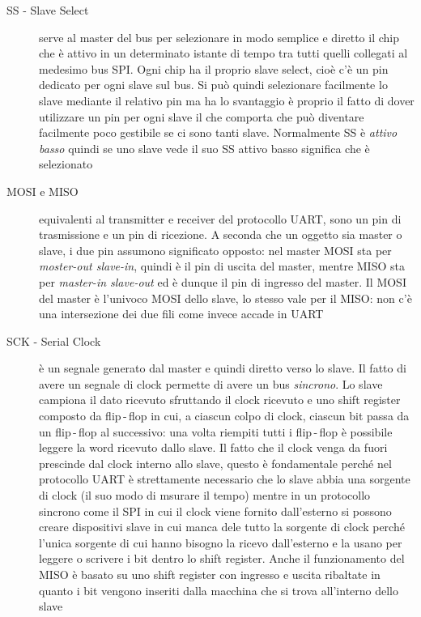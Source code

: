 \documentclass[12pt, a4paper]{report}
\begin{document}
\begin{description}
    \item[SS - Slave Select] serve al master del bus per selezionare in modo semplice e diretto il chip che è attivo in un determinato istante di tempo tra tutti quelli collegati al medesimo bus SPI. Ogni chip ha il proprio slave select, cioè c'è un pin dedicato per ogni slave sul bus. Si può quindi selezionare facilmente lo slave mediante il relativo pin ma ha lo svantaggio è proprio il fatto di dover utilizzare un pin per ogni slave il che comporta che può diventare facilmente poco gestibile se ci sono tanti slave. Normalmente SS è \textit{attivo basso} quindi se uno slave vede il suo SS attivo basso significa che è selezionato
    \item[MOSI e MISO] equivalenti al transmitter e receiver del protocollo UART, sono un pin di trasmissione e un pin di ricezione. A seconda che un oggetto sia master o slave, i due pin assumono significato opposto: nel master MOSI sta per \textit{moster-out slave-in}, quindi è il pin di uscita del master, mentre MISO sta per \textit{master-in slave-out} ed è dunque il pin di ingresso del master. Il MOSI del master è l'univoco MOSI dello slave, lo stesso vale per il MISO: non c'è una intersezione dei due fili come invece accade in UART
    \item[SCK - Serial Clock] è un segnale generato dal master e quindi diretto verso lo slave. Il fatto di avere un segnale di clock permette di avere un bus \textit{sincrono}. Lo slave campiona il dato ricevuto sfruttando il clock ricevuto e uno shift register composto da flip\,-\,flop in cui, a ciascun colpo di clock, ciascun bit passa da un flip\,-\,flop al successivo: una volta riempiti tutti i flip\,-\,flop è possibile leggere la word ricevuto dallo slave. Il fatto che il clock venga da fuori prescinde dal clock interno allo slave, questo è fondamentale perché nel protocollo UART è strettamente necessario che lo slave abbia una sorgente di clock (il suo modo di msurare il tempo) mentre in un protocollo sincrono come il SPI in cui il clock viene fornito dall'esterno si possono creare dispositivi slave in cui manca dele tutto la sorgente di clock perché l'unica sorgente di cui hanno bisogno la ricevo dall'esterno e la usano per leggere o scrivere i bit dentro lo shift register. Anche il funzionamento del MISO è basato su uno shift register con ingresso e uscita ribaltate in quanto i bit vengono inseriti dalla macchina che si trova all'interno dello slave
\end{description}
\end{document}
